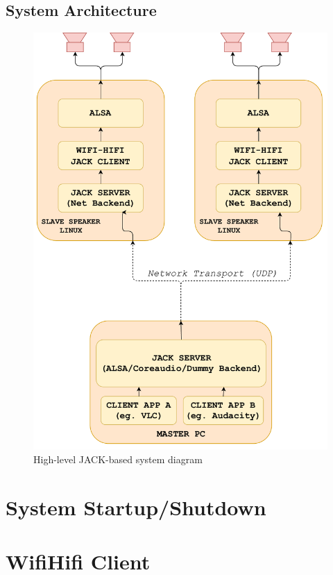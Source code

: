 \documentclass[main.tex]{subfiles}
\begin{document}
\subsection{System Architecture}
\begin{figure}[H]
    \centering
    \includegraphics[scale=0.4]{./figs/JACKclients.pdf}
    
    \caption{High-level JACK-based system diagram}
    \label{fig:JACKclients}
\end{figure}

\section{System Startup/Shutdown}

\section{WifiHifi Client}
\end{document}
